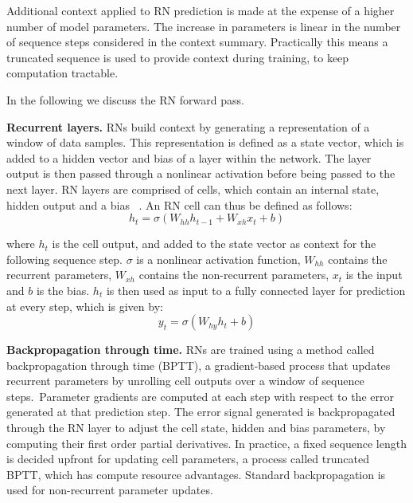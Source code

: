 \noindent Additional context applied to RN prediction is made at the expense of a higher number of model parameters. The increase in parameters is linear in the number of sequence steps considered in the context summary. Practically this means a truncated sequence is used to provide context during training, to keep computation tractable. \par

\noindent In the following we discuss the RN forward pass. \par

\noindent \textbf{Recurrent layers.} RNs build context by generating a representation of a window of data samples. This representation is defined as a state vector, which is added to a hidden vector and bias of a layer within the network. The layer output is then passed through a nonlinear activation before being passed to the next layer. RN layers are comprised of cells, which contain an internal state, hidden output and a bias \unskip ~\citep{DLIndaba2018}. An RN cell can thus be defined as follows: 
\begin{equation}
	h_t = \sigma(W_{hh}h_{t-1} + W_{xh}x_t + b)
\end{equation}

\noindent where $h_t$ is the cell output, and added to the state vector as context for the following sequence step. $\sigma$ is a nonlinear activation function, $W_{hh}$ contains the recurrent parameters, $W_{xh}$ contains the non-recurrent parameters, $x_t$ is the input and $b$ is the bias. $h_t$ is then used as input to a fully connected layer for prediction at every step, which is given by:
\begin{equation}
	y_t = \sigma(W_{hy}h_{t} + b)
\end{equation}

\noindent \textbf{Backpropagation through time.} RNs are trained using a method called backpropagation through time (BPTT),  a gradient-based process that updates recurrent parameters by unrolling cell outputs over a window of sequence steps.\ Parameter gradients are computed at each step with respect to the error generated at that prediction step. The error signal generated is backpropagated through the RN layer to adjust the cell state, hidden and bias parameters, by computing their first order partial derivatives. In practice, a fixed sequence length is decided upfront for updating cell parameters, a process called truncated BPTT, which has compute resource advantages. Standard backpropagation is used for non-recurrent parameter updates. \par

